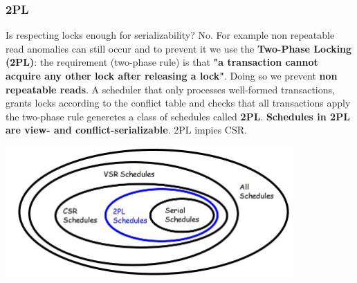 \subsubsection{2PL}
Is respecting locks enough for serializability? No. For example non repeatable read anomalies can still occur and to prevent it we use the \textbf{Two-Phase Locking (2PL)}: the requirement (two-phase rule) is that \textbf{"a transaction cannot acquire any other lock after releasing a lock"}. Doing so we prevent \textbf{non repeatable reads}.\newline
\newline
A scheduler that only processes well-formed transactions, grants locks according to the conflict table and checks that all transactions apply the two-phase rule generetes a class of schedules called \textbf{2PL}.\newline
\newline
\textbf{Schedules in 2PL are view- and conflict-serializable}. 2PL impies CSR.
\begin{center}
    \includegraphics[height=5cm]{../arguments/2PL.JPG}
\end{center}
